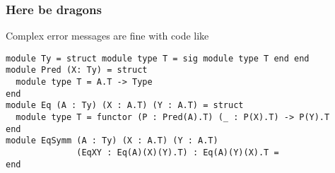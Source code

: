 
\begin{frame}[fragile]\frametitle{Here be dragons}

  Complex error messages are fine with code like
\begin{verbatim}
module Ty = struct module type T = sig module type T end end
module Pred (X: Ty) = struct
  module type T = A.T -> Type
end
module Eq (A : Ty) (X : A.T) (Y : A.T) = struct
  module type T = functor (P : Pred(A).T) (_ : P(X).T) -> P(Y).T
end
module EqSymm (A : Ty) (X : A.T) (Y : A.T)
              (EqXY : Eq(A)(X)(Y).T) : Eq(A)(Y)(X).T =
end
\end{verbatim}


\end{frame}
